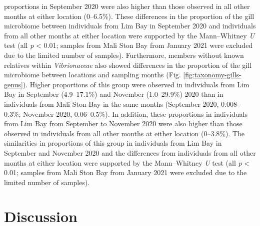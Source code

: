 \documentclass[
  12 pt,
]{article}
\begin{document}
proportions in September 2020 were also higher than those observed in all other months at either location (0--6.5\unit{\percent}). These differences in the proportion of the gill microbiome between individuals from Lim Bay in September 2020 and individuals from all other months at either location were supported by the Mann--Whitney \emph{U} test (all \emph{p} \textless{} 0.01; samples from Mali Ston Bay from January 2021 were excluded due to the limited number of samples). Furthermore,
members without known relatives within \emph{Vibrionaceae} also showed differences in the proportion of the gill microbiome between locations and sampling months (Fig. \ref{fig:taxonomy-gills-genus}). Higher proportions of this group were observed in individuals from Lim Bay in September (4.9--17.1\unit{\percent}) and November (1.0--29.9\unit{\percent}) 2020 than in individuals from Mali Ston Bay in the same months (September 2020, 0.008--0.3\unit{\percent}; November 2020, 0.06--0.5\unit{\percent}). In addition, these proportions in individuals from Lim Bay from September to November 2020 were also higher than those observed in individuals from all other months at either location (0--3.8\unit{\percent}). The similarities in proportions of this group in individuals from Lim Bay in September and November 2020 and the differences from individuals from all other months at either location were supported by the Mann--Whitney \emph{U} test (all \emph{p} \textless{} 0.01; samples from Mali Ston Bay from January 2021 were excluded due to the limited number of samples).
\newpage

\section{Discussion}\label{discussion}
\end{document}
